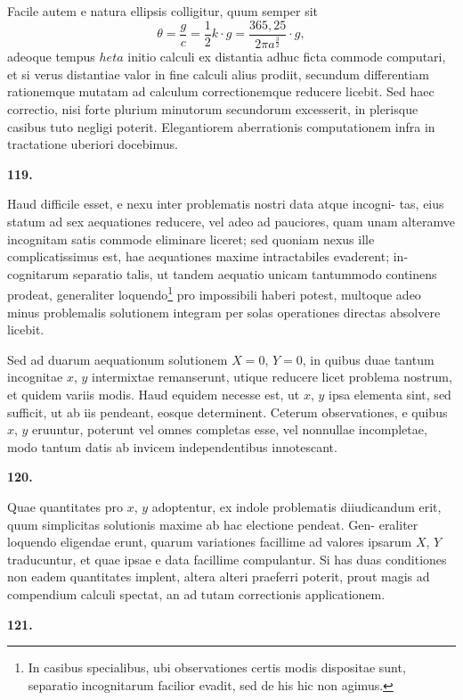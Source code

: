 \documentclass[12pt,a4paper]{article}
\begin{document}
Facile autem e natura ellipsis colligitur, quum semper sit
\[
\theta = \frac{g}{c} = \frac{1}{2}k\cdot g = \frac{365{,}25}{2\pi a^{\frac{3}{2}}}\cdot g,
\]
adeoque tempus $	heta$ initio calculi ex distantia adhuc ficta commode computari,
et si verus distantiae valor in fine calculi alius prodiit, secundum differentiam
rationemque mutatam ad calculum correctionemque reducere licebit. Sed haec
correctio, nisi forte plurium minutorum secundorum excesserit, in plerisque
casibus tuto negligi poterit. Elegantiorem aberrationis computationem infra
in tractatione uberiori docebimus.

\bigskip
\noindent\textbf{119.}

Haud difficile esset, e nexu inter problematis nostri data atque incogni-
tas, eius statum ad sex aequationes reducere, vel adeo ad pauciores, quam
unam alteramve incognitam satis commode eliminare liceret; sed quoniam nexus
ille complicatissimus est, hae aequationes maxime intractabiles evaderent; in-
cognitarum separatio talis, ut tandem aequatio unicam tantummodo continens
prodeat, generaliter loquendo\footnote{In casibus specialibus, ubi observationes certis modis dispositae sunt, separatio incognitarum
facilior evadit, sed de his hic non agimus.} pro impossibili haberi potest, multoque adeo minus
problemalis solutionem integram per solas operationes directas absolvere licebit.

Sed ad duarum aequationum solutionem $X = 0$, $Y = 0$, in quibus duae
tantum incognitae $x$, $y$ intermixtae remanserunt, utique reducere licet problema
nostrum, et quidem variis modis. Haud equidem necesse est, ut $x$, $y$ ipsa
elementa sint, sed sufficit, ut ab iis pendeant, eosque determinent. Ceterum
observationes, e quibus $x$, $y$ eruuntur, poterunt vel omnes completas esse, vel
nonnullae incompletae, modo tantum datis ab invicem independentibus innotescant.

\bigskip
\noindent\textbf{120.}

Quae quantitates pro $x$, $y$ adoptentur, ex indole problematis diiudicandum
erit, quum simplicitas solutionis maxime ab hac electione pendeat. Gen-
eraliter loquendo eligendae erunt, quarum variationes facillime ad valores ipsarum
$X$, $Y$ traducuntur, et quae ipsae e data facillime compulantur. Si has duas
conditiones non eadem quantitates implent, altera alteri praeferri poterit, prout
magis ad compendium calculi spectat, an ad tutam correctionis applicationem.

\bigskip
\noindent\textbf{121.}
\end{document}
